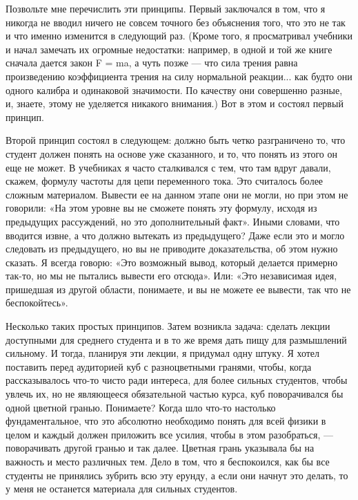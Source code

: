 \documentclass[11pt,oneside]{article}
\begin{document}
Позвольте мне перечислить эти принципы. Первый заключался в том, что я никогда не вводил ничего не совсем точного без объяснения того, что это не так и что именно изменится в следующий раз. (Кроме того, я просматривал учебники и начал замечать их огромные недостатки: например, в одной и той же книге сначала дается закон F = ma, а чуть позже --- что сила трения равна произведению коэффициента трения на силу нормальной реакции... как будто они одного калибра и одинаковой значимости. По качеству они совершенно разные, и, знаете, этому не уделяется никакого внимания.) Вот в этом и состоял первый принцип.\par



Второй принцип состоял в следующем: должно быть четко разграничено то, что студент должен понять на основе уже сказанного, и то, что понять из этого он еще не может. В учебниках я часто сталкивался с тем, что там вдруг давали, скажем, формулу частоты для цепи переменного тока. Это считалось более сложным материалом. Вывести ее на данном этапе они не могли, но при этом не говорили: «На этом уровне вы не сможете понять эту формулу, исходя из предыдущих рассуждений, но это дополнительный факт». Иными словами, что вводится извне, а что должно вытекать из предыдущего? Даже если это и могло следовать из предыдущего, но вы не приводите доказательства, об этом нужно сказать. Я всегда говорю: «Это возможный вывод, который делается примерно так-то, но мы не пытались вывести его отсюда». Или: «Это независимая идея, пришедшая из другой области, понимаете, и вы не можете ее вывести, так что не беспокойтесь».\par



Несколько таких простых принципов. Затем возникла задача: сделать лекции доступными для среднего студента и в то же время дать пищу для размышлений сильному. И тогда, планируя эти лекции, я придумал одну штуку. Я хотел поставить перед аудиторией куб с разноцветными гранями, чтобы, когда рассказывалось что-то чисто ради интереса, для более сильных студентов, чтобы увлечь их, но не являющееся обязательной частью курса, куб поворачивался бы одной цветной гранью. Понимаете? Когда шло что-то настолько фундаментальное, что это абсолютно необходимо понять для всей физики в целом и каждый должен приложить все усилия, чтобы в этом разобраться, --- поворачивать другой гранью и так далее. Цветная грань указывала бы на важность и место различных тем. Дело в том, что я беспокоился, как бы все студенты не принялись зубрить всю эту ерунду, а если они начнут это делать, то у меня не останется материала для сильных студентов.\par
\end{document}
